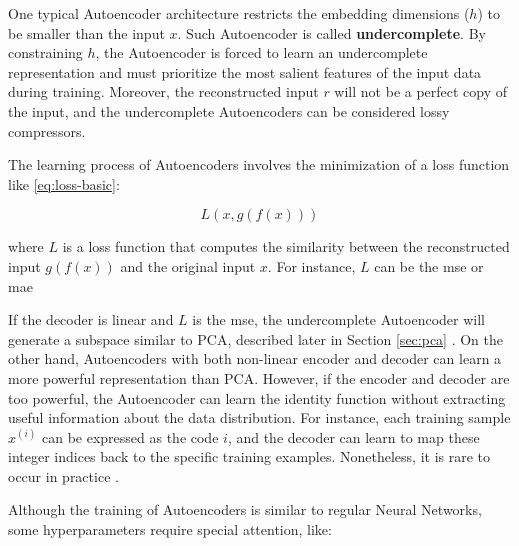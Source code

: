 One typical Autoencoder architecture restricts the embedding dimensions ($h$) to be smaller than the input $x$. Such Autoencoder is called \textbf{undercomplete}. By constraining $h$, the Autoencoder is forced to learn an undercomplete representation and must prioritize the most salient features of the input data during training. Moreover, the reconstructed input $r$ will not be a perfect copy of the input, and the undercomplete Autoencoders can be considered lossy compressors.

The learning process of Autoencoders involves the minimization of a loss function like \autoref{eq:loss-basic}:

\begin{equation}
\label{eq:loss-basic}
L(x, g(f(x)))
\end{equation}

\noindent
where $L$ is a loss function that computes the similarity between the reconstructed input $g(f(x))$ and the original input $x$. For instance, $L$ can be the \acf{mse} or \acf{mae}

If the decoder is linear and $L$ is the \acs{mse}, the undercomplete Autoencoder will generate a subspace similar to PCA, described later in Section \ref{sec:pca} \citep{lecun2015deep}. On the other hand, Autoencoders with both non-linear encoder and decoder can learn a more powerful representation than PCA. However, if the encoder and decoder are too powerful, the Autoencoder can learn the identity function without extracting useful information about the data distribution. For instance, each training sample $x^{(i)}$ can be expressed as the code $i$, and the decoder can learn to map these integer indices back to the specific training examples. Nonetheless, it is rare to occur in practice \citep{lecun2015deep}.

Although the training of Autoencoders is similar to regular Neural Networks, some hyperparameters require special attention, like:

